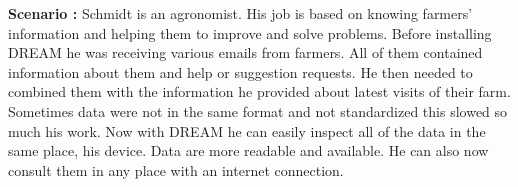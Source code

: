 \begin{flushleft}
\textbf{Scenario :} 
Schmidt is an agronomist. His job is based on knowing farmers' information and helping them to improve and solve problems. Before installing DREAM he was receiving various emails from farmers. All of them contained information about them and help or suggestion requests. He then needed to combined them with the information he provided about latest visits of their farm. Sometimes data were not in the same format and not standardized this slowed so much his work. Now with DREAM he can easily inspect all of the data in the same place, his device. Data are more readable and available. He can also now consult them in any place with an internet connection.
\end{flushleft}